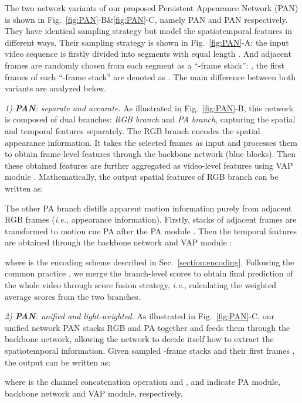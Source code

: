 \documentclass[journal]{IEEEtran}
\begin{document}
The two network variants of our proposed Persistent Appearance Network (PAN) is shown in Fig.~\ref{fig:PAN}-B\&\ref{fig:PAN}-C, namely PAN and PAN respectively. They have identical sampling strategy but model the spatiotemporal features in different ways. Their sampling strategy is shown in Fig.~\ref{fig:PAN}-A: the input video sequence  is firstly divided into  segments with equal length . And  adjacent frames are randomly chosen from each segment as a ``-frame stack'': , the first frames of each ``-frame stack'' are denoted as . The main difference between both variants are analyzed below.

\emph{1) \textbf{PAN}: separate and accurate.} As illustrated in Fig.~\ref{fig:PAN}-B, this network is composed of dual branches: \emph{RGB branch} and \emph{PA branch}, capturing the spatial and temporal features separately. The RGB branch encodes the spatial appearance information. It takes the selected  frames  as input and processes them to obtain frame-level features through the backbone network  (blue blocks). Then these obtained features are further aggregated as video-level features using VAP module . Mathematically, the output spatial features  of RGB branch can be written as:



The other PA branch distills apparent motion information purely from adjacent RGB frames (\emph{i.e.}, appearance information). Firstly,  stacks of  adjacent frames  are transformed to motion cue PA after the PA module . Then the temporal features  are obtained through the backbone network  and VAP module :



\noindent where  is the encoding scheme described in Sec.~\ref{section:encoding}. Following the common practice \cite{wang2016temporal,zhou2018temporal,lin2019tsm}, we merge the branch-level scores to obtain final prediction of the whole video through score fusion strategy, \emph{i.e.}, calculating the weighted average scores from the two branches. 

\emph{2) \textbf{PAN}: unified and light-weighted.} As illustrated in Fig.~\ref{fig:PAN}-C, our unified network PAN stacks RGB and PA together and feeds them through the backbone network, allowing the network to decide itself how to extract the spatiotemporal information. Given  sampled -frame stacks  and their first frames , the output  can be written as:



\noindent where  is the channel concatenation operation and ,  and  indicate PA module, backbone network and VAP module, respectively.
\end{document}
